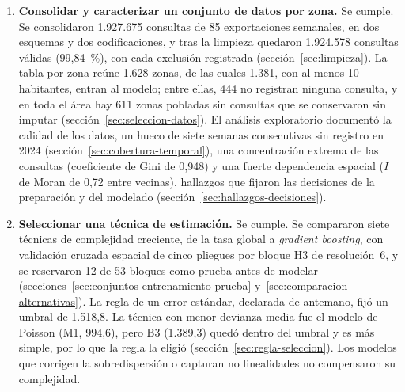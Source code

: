 \begin{enumerate}
  \item [OE1.] \textbf{Consolidar y caracterizar un conjunto de datos por zona.} Se cumple.
        Se consolidaron 1.927.675 consultas de 85 exportaciones semanales, en dos esquemas y
        dos codificaciones, y tras la limpieza quedaron 1.924.578 consultas válidas
        (99,84~\%), con cada exclusión registrada (sección~\ref{sec:limpieza}). La tabla por
        zona reúne 1.628 zonas, de las cuales 1.381, con al menos 10 habitantes, entran al
        modelo; entre ellas, 444 no registran ninguna consulta, y en toda el área hay 611
        zonas pobladas sin consultas que se conservaron sin imputar
        (sección~\ref{sec:seleccion-datos}). El análisis exploratorio documentó la calidad de
        los datos, un hueco de siete semanas consecutivas sin registro en 2024
        (sección~\ref{sec:cobertura-temporal}), una concentración extrema de las consultas
        (coeficiente de Gini de 0,948) y una fuerte dependencia espacial ($I$ de Moran de
        0,72 entre vecinas), hallazgos que fijaron las decisiones de la preparación y del
        modelado (sección~\ref{sec:hallazgos-decisiones}).

  \item [OE2.] \textbf{Seleccionar una técnica de estimación.} Se cumple. Se compararon
        siete técnicas de complejidad creciente, de la tasa global a \emph{gradient
        boosting}, con validación cruzada espacial de cinco pliegues por bloque H3 de
        resolución~6, y se reservaron 12 de 53 bloques como prueba antes de modelar
        (secciones~\ref{sec:conjuntos-entrenamiento-prueba}
        y~\ref{sec:comparacion-alternativas}). La regla de un error estándar, declarada de
        antemano, fijó un umbral de 1.518,8. La técnica con menor devianza media fue el
        modelo de Poisson (M1, 994,6), pero B3 (1.389,3) quedó dentro del umbral y es más
        simple, por lo que la regla la eligió (sección~\ref{sec:regla-seleccion}). Los
        modelos que corrigen la sobredispersión o capturan no linealidades no compensaron su
        complejidad.


\end{enumerate}
